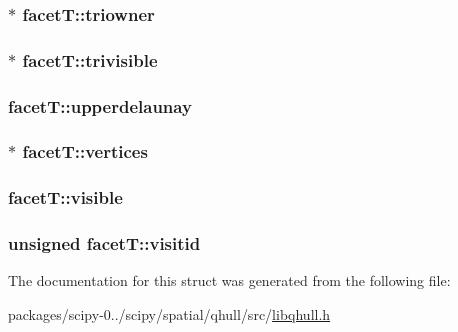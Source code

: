 \subsubsection[{triowner}]{$\ast$ facet\+T\+::triowner}\label{structfacetT_a9f412c007150ad02f21d3f49e1ac373b}
\hypertarget{structfacetT_a60f289fb95d5bfe600692bafd15e0d55}{}
\subsubsection[{trivisible}]{$\ast$ facet\+T\+::trivisible}\label{structfacetT_a60f289fb95d5bfe600692bafd15e0d55}
\hypertarget{structfacetT_a8a9b678a7ccc04ba4a07a13ab72f288f}{}
\subsubsection[{upperdelaunay}]{ facet\+T\+::upperdelaunay}\label{structfacetT_a8a9b678a7ccc04ba4a07a13ab72f288f}
\hypertarget{structfacetT_a41205d8bc5780862cd0f31a121efb08a}{}
\subsubsection[{vertices}]{$\ast$ facet\+T\+::vertices}\label{structfacetT_a41205d8bc5780862cd0f31a121efb08a}
\hypertarget{structfacetT_ad30d87686bedce39c496fa0252582418}{}
\subsubsection[{visible}]{ facet\+T\+::visible}\label{structfacetT_ad30d87686bedce39c496fa0252582418}
\hypertarget{structfacetT_ad8346c7d4996e805cd85366b8243e568}{}
\subsubsection[{visitid}]{\setlength{\rightskip}{0pt plus 5cm}unsigned facet\+T\+::visitid}\label{structfacetT_ad8346c7d4996e805cd85366b8243e568}


The documentation for this struct was generated from the following file\+:\begin{DoxyCompactItemize}
\item 
packages/scipy-\/0../scipy/spatial/qhull/src/\hyperlink{libqhull_8h}{libqhull.\+h}\end{DoxyCompactItemize}
